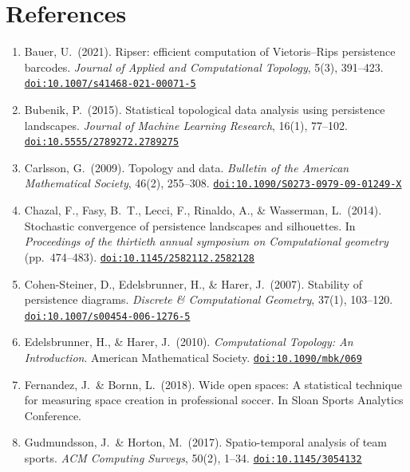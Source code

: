 \section{References}

\begin{enumerate}[label=\arabic*., leftmargin=*, itemsep=0.35em]
  \item Bauer, U.\ (2021). Ripser: efficient computation of Vietoris--Rips persistence barcodes. \emph{Journal of Applied and Computational Topology}, 5(3), 391--423. \href{https://doi.org/10.1007/s41468-021-00071-5}{\texttt{doi:10.1007/s41468-021-00071-5}}

  \item Bubenik, P.\ (2015). Statistical topological data analysis using persistence landscapes. \emph{Journal of Machine Learning Research}, 16(1), 77--102. \href{https://doi.org/10.5555/2789272.2789275}{\texttt{doi:10.5555/2789272.2789275}}

  \item Carlsson, G.\ (2009). Topology and data. \emph{Bulletin of the American Mathematical Society}, 46(2), 255--308. \href{https://doi.org/10.1090/S0273-0979-09-01249-X}{\texttt{doi:10.1090/S0273-0979-09-01249-X}}

  \item Chazal, F., Fasy, B.\ T., Lecci, F., Rinaldo, A., \& Wasserman, L.\ (2014). Stochastic convergence of persistence landscapes and silhouettes. In \emph{Proceedings of the thirtieth annual symposium on Computational geometry} (pp.\ 474--483). \href{https://doi.org/10.1145/2582112.2582128}{\texttt{doi:10.1145/2582112.2582128}}

  \item Cohen-Steiner, D., Edelsbrunner, H., \& Harer, J.\ (2007). Stability of persistence diagrams. \emph{Discrete \& Computational Geometry}, 37(1), 103--120. \href{https://doi.org/10.1007/s00454-006-1276-5}{\texttt{doi:10.1007/s00454-006-1276-5}}

  \item Edelsbrunner, H., \& Harer, J.\ (2010). \emph{Computational Topology: An Introduction}. American Mathematical Society. \href{https://doi.org/10.1090/mbk/069}{\texttt{doi:10.1090/mbk/069}}

  \item Fernandez, J.\ \& Bornn, L.\ (2018). Wide open spaces: A statistical technique for measuring space creation in professional soccer. In Sloan Sports Analytics Conference.

  \item Gudmundsson, J.\ \& Horton, M.\ (2017). Spatio-temporal analysis of team sports. \emph{ACM Computing Surveys}, 50(2), 1--34. \href{https://doi.org/10.1145/3054132}{\texttt{doi:10.1145/3054132}}


\end{enumerate}
